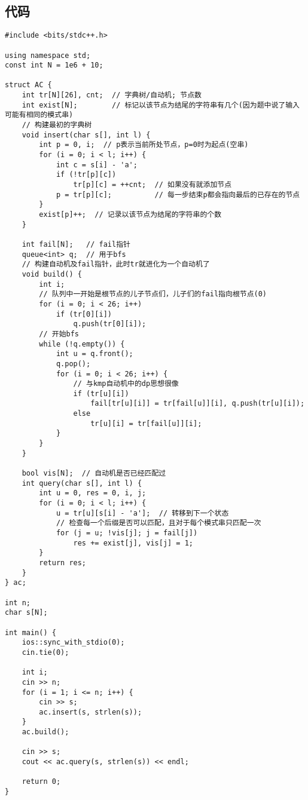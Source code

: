     \subsection{代码}
\begin{lstlisting}
#include <bits/stdc++.h>

using namespace std;
const int N = 1e6 + 10;

struct AC {
    int tr[N][26], cnt;  // 字典树/自动机; 节点数
    int exist[N];        // 标记以该节点为结尾的字符串有几个(因为题中说了输入可能有相同的模式串)
    // 构建最初的字典树
    void insert(char s[], int l) {
        int p = 0, i;  // p表示当前所处节点，p=0时为起点(空串)
        for (i = 0; i < l; i++) {
            int c = s[i] - 'a';
            if (!tr[p][c])
                tr[p][c] = ++cnt;  // 如果没有就添加节点
            p = tr[p][c];          // 每一步结束p都会指向最后的已存在的节点
        }
        exist[p]++;  // 记录以该节点为结尾的字符串的个数
    }

    int fail[N];   // fail指针
    queue<int> q;  // 用于bfs
    // 构建自动机及fail指针，此时tr就进化为一个自动机了
    void build() {
        int i;
        // 队列中一开始是根节点的儿子节点们，儿子们的fail指向根节点(0)
        for (i = 0; i < 26; i++)
            if (tr[0][i])
                q.push(tr[0][i]);
        // 开始bfs
        while (!q.empty()) {
            int u = q.front();
            q.pop();
            for (i = 0; i < 26; i++) {
                // 与kmp自动机中的dp思想很像
                if (tr[u][i])
                    fail[tr[u][i]] = tr[fail[u]][i], q.push(tr[u][i]);
                else
                    tr[u][i] = tr[fail[u]][i];
            }
        }
    }

    bool vis[N];  // 自动机是否已经匹配过
    int query(char s[], int l) {
        int u = 0, res = 0, i, j;
        for (i = 0; i < l; i++) {
            u = tr[u][s[i] - 'a'];  // 转移到下一个状态
            // 检查每一个后缀是否可以匹配，且对于每个模式串只匹配一次
            for (j = u; !vis[j]; j = fail[j])
                res += exist[j], vis[j] = 1;
        }
        return res;
    }
} ac;

int n;
char s[N];

int main() {
    ios::sync_with_stdio(0);
    cin.tie(0);

    int i;
    cin >> n;
    for (i = 1; i <= n; i++) {
        cin >> s;
        ac.insert(s, strlen(s));
    }
    ac.build();

    cin >> s;
    cout << ac.query(s, strlen(s)) << endl;

    return 0;
}
\end{lstlisting}
